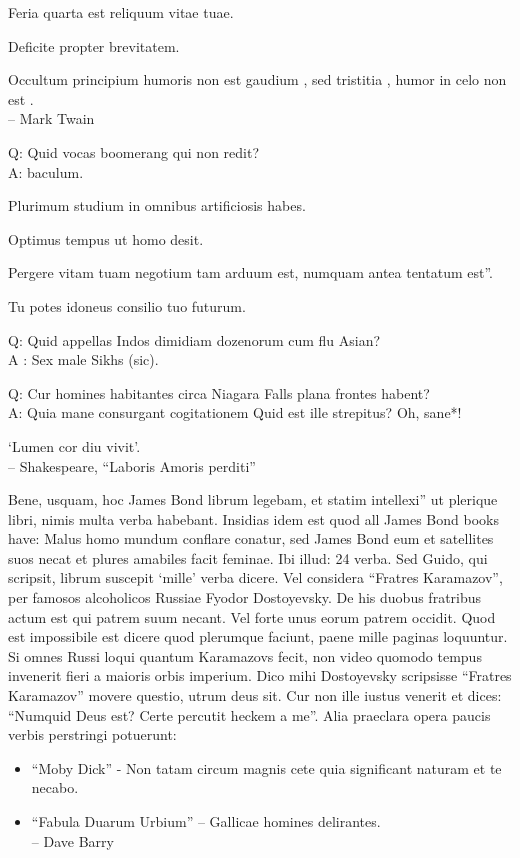 \documentclass[titlepage,12pt]{memoir}
\begin{document}
Feria quarta est reliquum vitae tuae.

Deficite propter brevitatem.

 Occultum principium humoris non est gaudium , sed tristitia , humor in celo non est .
\\-- Mark Twain

Q: Quid vocas boomerang qui non redit?\\
A: baculum.

Plurimum studium in omnibus artificiosis habes.

Optimus tempus ut homo desit.

Pergere vitam tuam negotium tam arduum est, numquam antea tentatum est”.

Tu potes idoneus consilio tuo futurum.

Q: Quid appellas Indos dimidiam dozenorum cum flu Asian?\\
A : Sex male Sikhs (sic).

Q: Cur homines habitantes circa Niagara Falls plana frontes habent?\\
A: Quia mane consurgant cogitationem Quid est ille strepitus?
Oh, sane*!

‘Lumen cor diu vivit’.
\\-- Shakespeare, “Laboris Amoris perditi”

Bene, usquam, hoc James Bond librum legebam, et statim intellexi”
ut plerique libri, nimis multa verba habebant. Insidias idem est quod
all James Bond books have: Malus homo mundum conflare conatur, sed
James Bond eum et satellites suos necat et plures amabiles facit
feminae. Ibi illud: 24 verba. Sed Guido, qui scripsit, librum suscepit
‘mille’ verba dicere.
Vel considera “Fratres Karamazov”, per famosos alcoholicos Russiae
Fyodor Dostoyevsky. De his duobus fratribus actum est qui patrem suum necant.
Vel forte unus eorum patrem occidit. Quod est impossibile est dicere
quod plerumque faciunt, paene mille paginas loquuntur. Si omnes Russi loqui
quantum Karamazovs fecit, non video quomodo tempus invenerit fieri a
maioris orbis imperium.
Dico mihi Dostoyevsky scripsisse “Fratres Karamazov” movere
questio, utrum deus sit. Cur non ille iustus venerit
et dices: “Numquid Deus est? Certe percutit heckem a me”.
Alia praeclara opera paucis verbis perstringi potuerunt:
\begin{itemize}
\item “Moby Dick” - Non tatam circum magnis cete quia significant
  naturam et te necabo.
\item “Fabula Duarum Urbium” -- Gallicae homines delirantes.
\\-- Dave Barry
\end{itemize}
\end{document}
